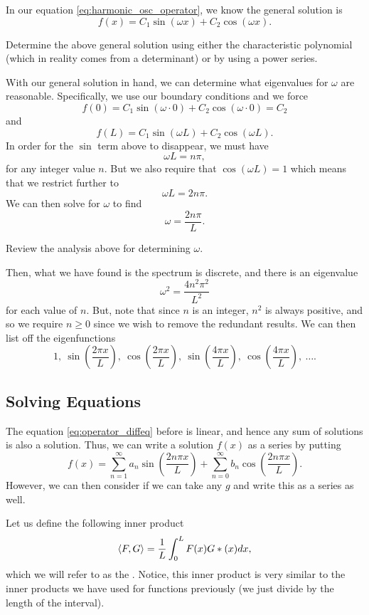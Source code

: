 In our equation \ref{eq:harmonic_osc_operator}, we know the general solution is
\[
f(x) = C_1 \sin(\omega x)+C_2 \cos(\omega x).  
\]

\begin{exercise}
	Determine the above general solution using either the characteristic polynomial (which in reality comes from a determinant) or by using a power series.
\end{exercise}

With our general solution in hand, we can determine what eigenvalues for $\omega$ are reasonable.  Specifically, we use our boundary conditions and we force
\[
f(0)=C_1 \sin(\omega \cdot 0) + C_2 \cos(\omega \cdot 0) = C_2
\]
and
\[
f(L) = C_1 \sin(\omega L) + C_2 \cos(\omega L).
\]
In order for the $\sin$ term above to disappear, we must have
\[
\omega L = n \pi,
\]
for any integer value $n$. But we also require that $\cos(\omega L)=1$ which means that we restrict further to
\[
\omega L = 2n\pi.  
\]
We can then solve for $\omega$ to find
\[
\boxed{\omega = \frac{2n\pi}{L}.}
\]

\begin{exercise}
	Review the analysis above for determining $\omega$.
\end{exercise}

Then, what we have found is the spectrum is discrete, and there is an eigenvalue 
\[
\omega^2 = \frac{4 n^2 \pi^2}{L^2}
\]
for each value of $n$.  But, note that since $n$ is an integer, $n^2$ is always positive, and so we require $n\geq 0$ since we wish to remove the redundant results.  We can then list off the eigenfunctions
\[
1,~\sin\left(\frac{2 \pi x}{L}\right),~ \cos\left(\frac{2 \pi x}{L}\right), ~\sin\left(\frac{4 \pi x}{L}\right),~ \cos\left(\frac{4 \pi x}{L}\right), ~ \dots.
\]

\subsection{Solving Equations}

The equation \ref{eq:operator_diffeq} before is linear, and hence any sum of solutions is also a solution.  Thus, we can write a solution $f(x)$ as a series by putting
\[
f(x) = \sum_{n=1}^\infty a_n \sin\left(\frac{2n\pi x}{L}\right) + \sum_{n=0}^\infty b_n \cos\left(\frac{2n\pi x}{L} \right).
\]
However, we can then consider if we can take any $g$ and write this as a series as well. 

Let us define the following inner product
\[
\left\langle F, G \right\rangle = \frac{1}{L} \int_0^L F(x)G*(x)dx,
\]
which we will refer to as the .  Notice, this inner product is very similar to the inner products we have used for functions previously (we just divide by the length of the interval).

